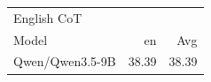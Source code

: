 \begin{tabular}{lrr}
\hline
\multicolumn{3}{l}{English CoT} \\
Model & en & Avg \\
\hline
Qwen/Qwen3.5-9B & 38.39 & 38.39 \\
\hline
\end{tabular}
